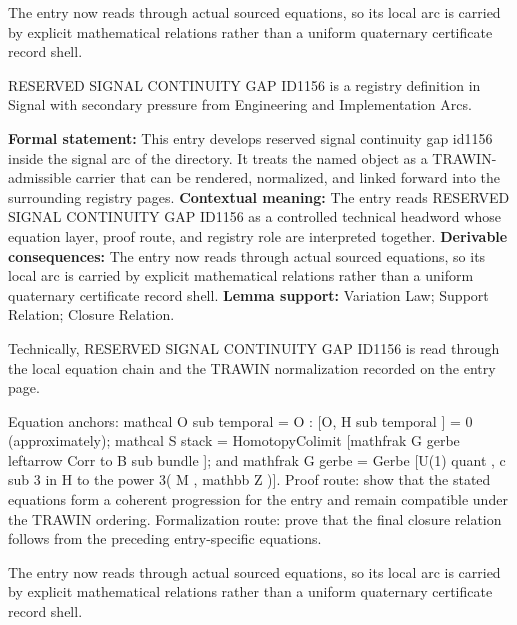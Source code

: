The entry now reads through actual sourced equations, so its local arc is carried by explicit mathematical relations rather than a uniform quaternary certificate record shell.
\clearpage


\begingroup\small
{}
RESERVED SIGNAL CONTINUITY GAP ID1156 is a registry definition in Signal with secondary pressure from Engineering and Implementation Arcs.

\begingroup\footnotesize\setlength{\emergencystretch}{3em}\sloppy
\textbf{Formal statement:} This entry develops reserved signal continuity gap id1156 inside the signal arc of the directory. It treats the named object as a TRAWIN-admissible carrier that can be rendered, normalized, and linked forward into the surrounding registry pages. \textbf{Contextual meaning:} The entry reads RESERVED SIGNAL CONTINUITY GAP ID1156 as a controlled technical headword whose equation layer, proof route, and registry role are interpreted together. \textbf{Derivable consequences:} The entry now reads through actual sourced equations, so its local arc is carried by explicit mathematical relations rather than a uniform quaternary certificate record shell. \textbf{Lemma support:} Variation Law; Support Relation; Closure Relation.\par
\endgroup

Technically, RESERVED SIGNAL CONTINUITY GAP ID1156 is read through the local equation chain and the TRAWIN normalization recorded on the entry page.

Equation anchors: mathcal O sub temporal = O : [O, H sub temporal ] = 0 (approximately); mathcal S stack = HomotopyColimit [mathfrak G gerbe leftarrow Corr to B sub bundle ]; and mathfrak G gerbe = Gerbe [U(1) quant , c sub 3 in H to the power 3( M , mathbb Z )]. Proof route: show that the stated equations form a coherent progression for the entry and remain compatible under the TRAWIN ordering. Formalization route: prove that the final closure relation follows from the preceding entry-specific equations.

The entry now reads through actual sourced equations, so its local arc is carried by explicit mathematical relations rather than a uniform quaternary certificate record shell.
\endgroup


